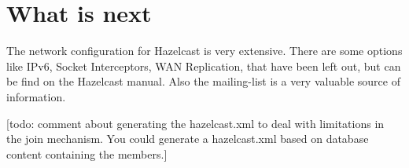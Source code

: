 \section{What is next}
The network configuration for Hazelcast is very extensive. There are some options like IPv6, Socket Interceptors, WAN Replication, that have been left out, but can be find on the Hazelcast manual. Also the mailing-list is a very valuable source of information. 

[todo: comment about generating the hazelcast.xml to deal with limitations in the join mechanism. You could generate
a hazelcast.xml based on database content containing the members.]
